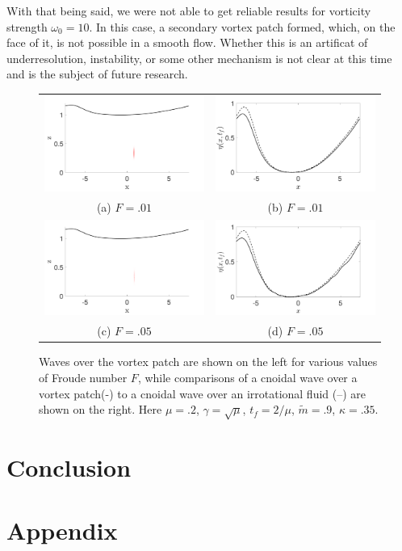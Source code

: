 \documentclass[a4paper,11pt]{article}
\begin{document}
With that being said, we were not able to get reliable results for vorticity strength $\omega_{0}=10$.  In this case, a secondary vortex patch formed, which, on the face of it, is not possible in a smooth flow.  Whether this is an artificat of underresolution, instability, or some other mechanism is not clear at this time and is the subject of future research.  
\begin{figure}
\centering
\begin{tabular}{cc}
\includegraphics[width=.35\textwidth]{wave_over_vortices_m_pt9_w0_1} & \includegraphics[width=.35\textwidth]{profiles_m_pt9_w0_1}\\
(a)  $F=.01$ & (b)  $F=.01$\\
\includegraphics[width=.35\textwidth]{wave_over_vortices_m_pt9_w0_5} & \includegraphics[width=.35\textwidth]{profiles_m_pt9_w0_5}\\
(c)  $F=.05$ & (d)  $F=.05$
\end{tabular}
\caption{Waves over the vortex patch are shown on the left for various values of Froude number $F$, while comparisons of a cnoidal wave over a vortex patch(-) to a cnoidal wave over an irrotational fluid (--) are shown on the right.  Here $\mu=.2$, $\gamma=\sqrt{\mu}$, $t_{f}=2/\mu$, $\tilde{m}=.9$, $\kappa = .35$.}
\label{fig:highsolwave}
\end{figure}
\section*{Conclusion}
\section*{Appendix}


\end{document}
